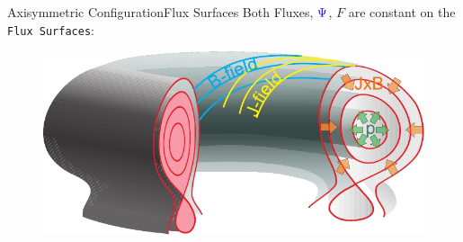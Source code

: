 \documentclass{beamer}
\begin{document}
\begin{frame}{Axisymmetric Configuration}{Flux Surfaces}
Both Fluxes, { $\color{blue} \Psi$}, {\color{red} $F$}   are constant on the  \texttt{Flux Surfaces}:
	\begin{figure}[ht]
	\begin{center}
	\includegraphics[width=.8\columnwidth]{Tokamak_Equilibrium.jpg} %
	\end{center}
	\end{figure}

\end{frame}
\end{document}
